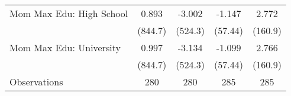 {\begin{tabular}{l*{4}{c}}
\addlinespace
Mom Max Edu: High School&       0.893         &      -3.002         &      -1.147         &       2.772         \\
                    &     (844.7)         &     (524.3)         &     (57.44)         &     (160.9)         \\
\addlinespace
Mom Max Edu: University&       0.997         &      -3.134         &      -1.099         &       2.766         \\
                    &     (844.7)         &     (524.3)         &     (57.44)         &     (160.9)         \\
\midrule
Observations        &         280         &         280         &         285         &         285         \\
\bottomrule
\end{tabular}
}
